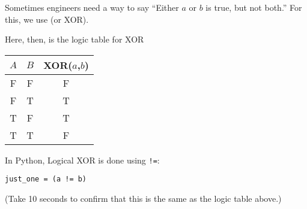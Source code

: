 Sometimes engineers need a way to say ``Either $a$ or $b$ is true, but not
both.'' For this, we use  (or XOR).

Here, then, is the logic table for XOR

\begin{tabular}{c | c | c}
  $A$ & $B$ & XOR($a$,$b$) \\
  \hline
  F & F & F \\
  F & T & T \\
  T & F & T \\
  T & T & F \\
\end{tabular}

In Python, Logical XOR is done using \texttt{!=}:

\begin{verbatim}
just_one = (a != b)
\end{verbatim}

(Take 10 seconds to confirm that this is the same as the logic table
above.)



